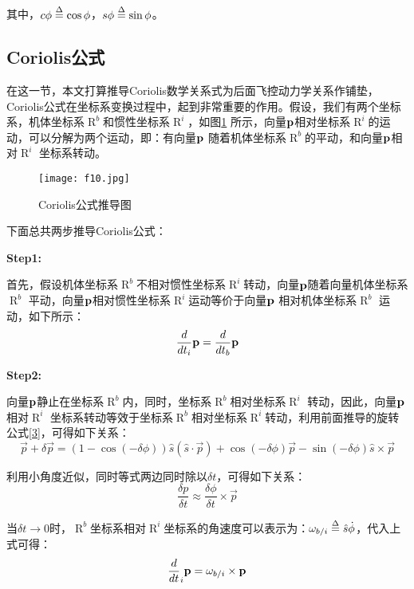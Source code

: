 其中，$c\phi  \buildrel \Delta \over = \cos \phi $，$s\phi  \buildrel \Delta \over = \sin \phi $。
\subsection{Coriolis公式}\label{2.1.3}
在这一节，本文打算推导Coriolis数学关系式为后面飞控动力学关系作铺垫，Coriolis公式在坐标系变换过程中，起到非常重要的作用。假设，我们有两个坐标系，机体坐标系$\mathop R\nolimits^b $和惯性坐标系$\mathop R\nolimits^i $，如图\ref{fig9} 所示，向量${\bf{p}}$相对坐标系$\mathop R\nolimits^i $的运动，可以分解为两个运动，即：有向量${\bf{p}}$ 随着机体坐标系$\mathop R\nolimits^b $的平动，和向量${\bf{p}}$相对$\mathop R\nolimits^i $ 坐标系转动。
\begin{figure}[!ht]
\centering
\texttt{[image: f10.jpg]}
\caption{Coriolis公式推导图}
\label{fig9}
\end{figure}
下面总共两步推导Coriolis公式：

\textbf{Step1:}

首先，假设机体坐标系$\mathop R\nolimits^b $不相对惯性坐标系$\mathop R\nolimits^i $转动，向量${\bf{p}}$随着向量机体坐标系$\mathop R\nolimits^b $ 平动，向量${\bf{p}}$相对惯性坐标系$\mathop R\nolimits^i $运动等价于向量${\bf{p}}$ 相对机体坐标系$\mathop R\nolimits^b $ 运动，如下所示：
\begin{equation}\label{4}
\frac{d}{{d{t_i}}}{\bf{p}} = \frac{d}{{d{t_b}}}{\bf{p}}
\end{equation}

\textbf{Step2:}

向量${\bf{p}}$静止在坐标系$\mathop R\nolimits^b $内，同时，坐标系$\mathop R\nolimits^b $相对坐标系$\mathop R\nolimits^i $ 转动，因此，向量${\bf{p}}$相对$\mathop R\nolimits^i $ 坐标系转动等效于坐标系$\mathop R\nolimits^b $相对坐标系$\mathop R\nolimits^i $转动，利用前面推导的旋转公式\ref{3}，可得如下关系：
\[\vec p + \delta \vec p = \left( {1 - \cos \left( { - \delta \phi } \right)} \right)\hat s\left( {\hat s \cdot \vec p} \right) + \cos \left( { - \delta \phi } \right)\vec p - \sin \left( { - \delta \phi } \right)\hat s \times \vec p\]

利用小角度近似，同时等式两边同时除以$\delta t$，可得如下关系：
\[\frac{{\delta p}}{{\delta t}} \approx \frac{{\delta \phi }}{{\delta t}} \times \vec p\]

当$\delta t \to 0$时，$\mathop R\nolimits^b $坐标系相对$\mathop R\nolimits^i$坐标系的角速度可以表示为：${\omega _{b/i}} \buildrel \Delta \over = \hat s\dot \phi $，代入上式可得：
\begin{equation}\label{5}
{\frac{d}{{dt}}_i}{\bf{p}} = {\omega _{b/i}} \times {\bf{p}}
\end{equation}


